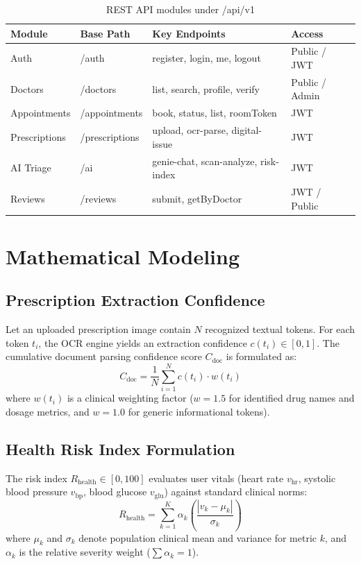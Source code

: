 \documentclass[12pt,a4paper]{report}
\begin{document}
\begin{table}[htbp]
\centering
\caption{REST API modules under /api/v1}
\label{tab:api_modules}
\begin{tabularx}{\textwidth}{p{2.5cm} p{2.8cm} X p{2.2cm}}
\toprule
\textbf{Module} & \textbf{Base Path} & \textbf{Key Endpoints} & \textbf{Access} \\
\midrule
Auth & /auth & register, login, me, logout & Public / JWT \\
Doctors & /doctors & list, search, profile, verify & Public / Admin \\
Appointments & /appointments & book, status, list, roomToken & JWT \\
Prescriptions & /prescriptions & upload, ocr-parse, digital-issue & JWT \\
AI Triage & /ai & genie-chat, scan-analyze, risk-index & JWT \\
Reviews & /reviews & submit, getByDoctor & JWT / Public \\
\bottomrule
\end{tabularx}
\end{table}

\section{Mathematical Modeling}
\subsection{Prescription Extraction Confidence}
Let an uploaded prescription image contain $N$ recognized textual tokens. For each token $t_i$, the OCR engine yields an extraction confidence $c(t_i) \in [0, 1]$. The cumulative document parsing confidence score $C_{\text{doc}}$ is formulated as:
\begin{equation}
    C_{\text{doc}} = \frac{1}{N} \sum_{i=1}^{N} c(t_i) \cdot w(t_i)
\end{equation}
where $w(t_i)$ is a clinical weighting factor ($w=1.5$ for identified drug names and dosage metrics, and $w=1.0$ for generic informational tokens).

\subsection{Health Risk Index Formulation}
The risk index $R_{\text{health}} \in [0, 100]$ evaluates user vitals (heart rate $v_{\text{hr}}$, systolic blood pressure $v_{\text{bp}}$, blood glucose $v_{\text{glu}}$) against standard clinical norms:
\begin{equation}
    R_{\text{health}} = \sum_{k=1}^{K} \alpha_k \left( \frac{|v_k - \mu_k|}{\sigma_k} \right)
\end{equation}
where $\mu_k$ and $\sigma_k$ denote population clinical mean and variance for metric $k$, and $\alpha_k$ is the relative severity weight ($\sum \alpha_k = 1$).
\end{document}
